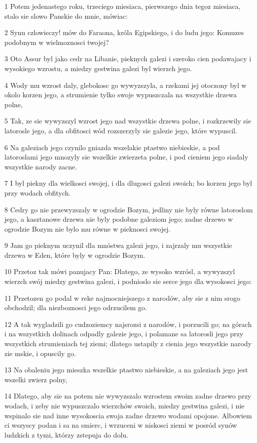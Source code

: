 \par 1 Potem jedenastego roku, trzeciego miesiaca, pierwszego dnia tegoz miesiaca, stalo sie slowo Panskie do mnie, mówiac:
\par 2 Synu czlowieczy! mów do Faraona, króla Egipskiego, i do ludu jego: Komuzes podobnym w wielmoznosci twojej?
\par 3 Oto Assur byl jako cedr na Libanie, pieknych galezi i szeroko cien podawajacy i wysokiego wzrostu, a miedzy gestwina galezi byl wierzch jego.
\par 4 Wody mu wzrost daly, glebokosc go wywyzszyla, a rzekami jej otoczony byl w okolo korzen jego, a strumienie tylko swoje wypuszczala na wszystkie drzewa polne,
\par 5 Tak, ze sie wywyzszyl wzrost jego nad wszystkie drzewa polne, i rozkrzewily sie latorosle jego, a dla obfitosci wód rozszerzyly sie galezie jego, które wypuscil.
\par 6 Na galeziach jego czynilo gniazda wszelakie ptastwo niebieskie, a pod latoroslami jego mnozyly sie wszelkie zwierzeta polne, i pod cieniem jego siadaly wszystkie narody zacne.
\par 7 I byl piekny dla wielkosci swojej, i dla dlugosci galezi swoich; bo korzen jego byl przy wodach obfitych.
\par 8 Cedry go nie przewyzszaly w ogrodzie Bozym, jedliny nie byly równe latoroslom jego, a kasztanowe drzewa nie byly podobne galeziom jego; zadne drzewo w ogrodzie Bozym nie bylo mu równe w pieknosci swojej.
\par 9 Jam go pieknym uczynil dla mnóstwa galezi jego, i zajrzaly mu wszystkie drzewa w Eden, które byly w ogrodzie Bozym.
\par 10 Przetoz tak mówi panujacy Pan: Dlatego, ze wysoko wzrósl, a wywyzszyl wierzch swój miedzy gestwina galezi, i podnioslo sie serce jego dla wysokosci jego:
\par 11 Przetozen go podal w reke najmocniejszego z narodów, aby sie z nim srogo obchodzil; dla niezboznosci jego odrzucilem go.
\par 12 A tak wygladzili go cudzoziemcy najsrozsi z narodów, i porzucili go; na górach i na wszystkich dolinach odpadly galezie jego, i polamane sa latorosli jego przy wszystkich strumieniach tej ziemi; dlatego ustapily z cienia jego wszystkie narody zie mskie, i opuscily go.
\par 13 Na obaleniu jego mieszka wszelkie ptastwo niebieskie, a na galeziach jego jest wszelki zwierz polny,
\par 14 Dlatego, aby sie na potem nie wywyzszalo wzrostem swoim zadne drzewo przy wodach, i zeby nie wypuszczalo wierzchów swoich, miedzy gestwina galezi, i nie wspinalo sie nad inne wysokoscia swoja zadne drzewo wodami opojone. Albowiem ci wszyscy podan i sa na smierc, i wrzuceni w niskosci ziemi w posród synów ludzkich z tymi, którzy zstepuja do dolu.
